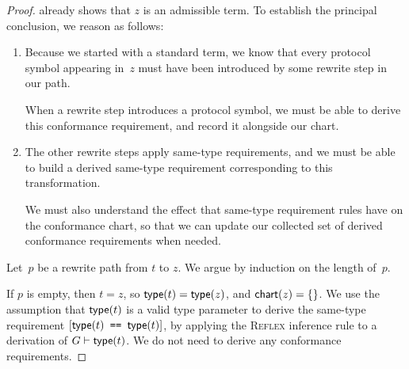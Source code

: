\documentclass[../generics]{subfiles}
\begin{document}
\begin{proof}
 already shows that $z$ is an admissible term. To establish the principal conclusion, we reason as follows:
\begin{enumerate}
\item Because we started with a standard term, we know that every protocol symbol appearing in~$z$ must have been introduced by some rewrite step in our path.

When a rewrite step introduces a protocol symbol, we must be able to derive this conformance requirement, and record it alongside our chart.

\item The other rewrite steps apply same-type requirements, and we must be able to build a derived same-type requirement corresponding to this transformation.

We must also understand the effect that same-type requirement rules have on the conformance chart, so that we can update our collected set of derived conformance requirements when needed.
\end{enumerate}
Let~$p$ be a rewrite path from $t$ to $z$. We argue by induction on the length of~$p$.

\BaseCase If $p$ is empty, then $t=z$, so $\mathsf{type}(t)=\mathsf{type}(z)$, and $\mathsf{chart}(z)=\{\}$.
We use the assumption that $\mathsf{type}(t)$ is a valid type parameter to derive the same-type requirement $[\texttt{$\mathsf{type}(t)$ == $\mathsf{type}(t)$}]$, by applying the \textsc{Reflex} inference rule to a derivation of $G\vdash\mathsf{type}(t)$. We do not need to derive any conformance requirements.


\end{proof}
\end{document}
